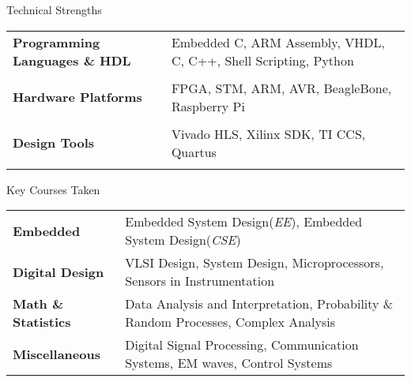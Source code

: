 \documentclass{resume}
\begin{document}
\begin{rSection}{Technical Strengths}

\begin{tabular}{@{} >{\bfseries}l @{\hspace{6ex}} l}

{\bf Programming Languages \& HDL} &  Embedded C, ARM Assembly, VHDL, C, C++, Shell Scripting, Python\\ \vspace{-0.3cm}

\\{\bf Hardware Platforms} & FPGA, STM, ARM, AVR, BeagleBone, Raspberry Pi\\ \vspace{-0.3cm}

\\{\bf Design Tools} &  Vivado HLS, Xilinx SDK, TI CCS, Quartus \\ \vspace{-0.3cm}


\end{tabular}

\end{rSection}


\vspace{-0.1cm}

\begin{rSection}{Key Courses Taken}

\begin{tabular}{l l}

{\bf{Embedded}}           & Embedded System Design(\emph{EE}), Embedded System Design(\emph{CSE})\\

{\bf{Digital Design}}     & VLSI Design, System Design, Microprocessors, Sensors in Instrumentation\\

{\bf{Math \& Statistics}} & Data Analysis and Interpretation, Probability \& Random Processes, Complex Analysis \\ 

{\bf{Miscellaneous}}      & Digital Signal Processing, Communication Systems, EM waves, Control Systems \\%

\end{tabular}

\end{rSection}
\end{document}

